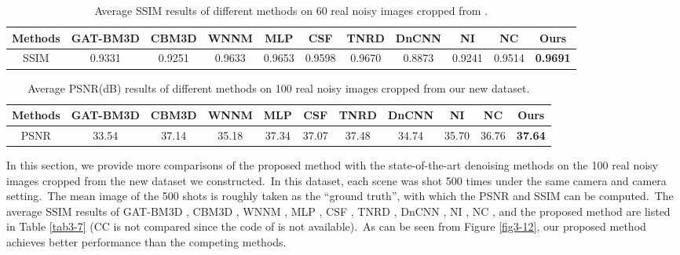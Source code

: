 \begin{table}[htpb]
\begin{adjustwidth}{-1cm}{}
\scriptsize
\caption{Average SSIM \cite{ssim} results of different methods on 60 real noisy images cropped from \cite{crosschannel2016}.}
\label{tab3-5}
\begin{center}
\renewcommand\arraystretch{1}
\begin{tabular}{|c||c|c|c|c|c|c|c|c|c|c|}
\hline
Methods
&\textbf{GAT-BM3D}
&\textbf{CBM3D}
&\textbf{WNNM}
&\textbf{MLP}
&\textbf{CSF} 
&\textbf{TNRD} 
&\textbf{DnCNN}
&\textbf{NI} 
&\textbf{NC} 
&\textbf{Ours} 
\\
\hline
SSIM  
& 0.9331 & 0.9251 & 0.9633 & 0.9653 & 0.9598 & 0.9670 & 0.8873 & 0.9241 & 0.9514 & \textbf{0.9691}
\\
\hline
\end{tabular}
\end{center}
\end{adjustwidth}
\end{table}




\begin{table}
\begin{adjustwidth}{-2cm}{}
\scriptsize
\caption{Average PSNR(dB) results of different methods on 100 real noisy images cropped from our new dataset.}
\vspace{-4mm}
\label{tab3-6}
\begin{center}
\renewcommand\arraystretch{1}
\begin{tabular}{|c||c|c|c|c|c|c|c|c|c|c|}
\hline
Methods
&\textbf{GAT-BM3D}
&\textbf{CBM3D}
&\textbf{WNNM}
&\textbf{MLP}
&\textbf{CSF} 
&\textbf{TNRD} 
&\textbf{DnCNN}
&\textbf{NI} 
&\textbf{NC} 
&\textbf{Ours} 
\\
\hline
PSNR  
& 33.54 & 37.14 & 35.18 & 37.34 & 37.07 & 37.48 & 34.74 & 35.70 & 36.76 & \textbf{37.64}
\\
\hline
\end{tabular}
\end{center}
\end{adjustwidth}
\end{table}

In this section, we provide more comparisons of the proposed method with the state-of-the-art denoising methods on the 100 real noisy images cropped from the new dataset we constructed.\ In this dataset, each scene was shot 500 times under the same camera and camera setting.\ The mean image of the 500 shots is roughly taken as the ``ground truth'', with which the PSNR and SSIM can be computed.\ The average  SSIM results of GAT-BM3D \cite{makitalo2013optimal}, CBM3D \cite{bm3d}, WNNM \cite{wnnm}, MLP \cite{mlp}, CSF \cite{csf}, TNRD \cite{chen2015learning}, DnCNN \cite{dncnn}, NI \cite{neatimage}, NC \cite{noiseclinic,ncwebsite}, and the proposed method are listed in Table \ref{tab3-7} (CC is not compared since the code of \cite{crosschannel2016} is not available).\ As can be seen from Figure \ref{fig3-12}, our proposed method achieves better performance than the competing methods.


